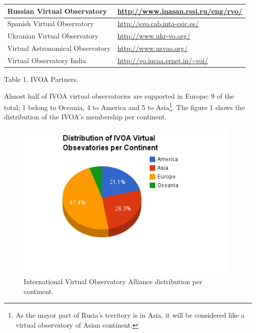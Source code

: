 \documentclass[11pt]{article}
\begin{document}
\begin{center}
\begin{tabular}{|p{7cm} | p{7cm}|}
                    Russian Virtual Observatory &
\url{http://www.inasan.rssi.ru/eng/rvo/} \\
                    \hline
                    Spanish Virtual Observatory &
\url{http://svo.cab.inta-csic.es/} \\
                    \hline
                    Ukranian Virtual Observatory & \url{http://www.ukr-vo.org/}
\\
                    \hline
                    Virtual Astronomical Observatory &
\url{http://www.usvao.org/} \\
                    \hline
                    Virtual Observatory India &
\url{http://vo.iucaa.ernet.in/~voi/} \\
                    \hline
                \end{tabular}

            Table 1. IVOA Partners.
            \end{center}

            Almost half of IVOA virtual observatories are supported in Europe: 9
of the total; 1 belong to Oceania, 4 to America and 5 to Asia\footnote{As the
mayor part of Rusia's territory is in Asia, it will be considered like a virtual
observatory of Asian continent.}. The figure 1 shows the distribution of the
IVOA's membership per continent.\\

            \begin{figure}[h]
                \begin{center}
                    \includegraphics[width=110mm]
{IVOA_VOs_distribution_per_continent_by_JDMT.png}
                    \caption{International Virtual Observatory Alliance
distribution per continent.}
                \end{center}
            \end{figure}
\end{document}
